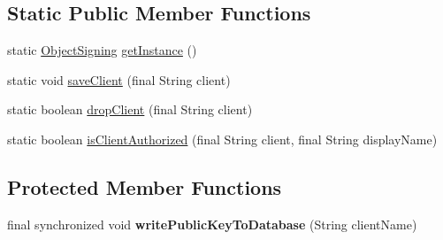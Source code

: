 \subsection*{Static Public Member Functions}
\begin{DoxyCompactItemize}
\item 
static \hyperlink{classgov_1_1fnal_1_1ppd_1_1dd_1_1util_1_1specific_1_1ObjectSigning}{Object\-Signing} \hyperlink{classgov_1_1fnal_1_1ppd_1_1dd_1_1util_1_1specific_1_1ObjectSigning_a905548cd8a28135026ff8cd2e3f09598}{get\-Instance} ()
\item 
static void \hyperlink{classgov_1_1fnal_1_1ppd_1_1dd_1_1util_1_1specific_1_1ObjectSigning_a2c6282d1254482c733c5bdb01ae4fd2b}{save\-Client} (final String client)
\item 
static boolean \hyperlink{classgov_1_1fnal_1_1ppd_1_1dd_1_1util_1_1specific_1_1ObjectSigning_ab51a44acbc4795b78f9b608c361e9369}{drop\-Client} (final String client)
\item 
static boolean \hyperlink{classgov_1_1fnal_1_1ppd_1_1dd_1_1util_1_1specific_1_1ObjectSigning_a462a209a028c4c3f44ab861d0a56ab8f}{is\-Client\-Authorized} (final String client, final String display\-Name)
\end{DoxyCompactItemize}
\subsection*{Protected Member Functions}
\begin{DoxyCompactItemize}
\item 
\hypertarget{classgov_1_1fnal_1_1ppd_1_1dd_1_1util_1_1specific_1_1ObjectSigning_a07b9c0efe4e036f0902c8d4a18e05693}{final synchronized void {\bfseries write\-Public\-Key\-To\-Database} (String client\-Name)}\label{classgov_1_1fnal_1_1ppd_1_1dd_1_1util_1_1specific_1_1ObjectSigning_a07b9c0efe4e036f0902c8d4a18e05693}

\end{DoxyCompactItemize}


